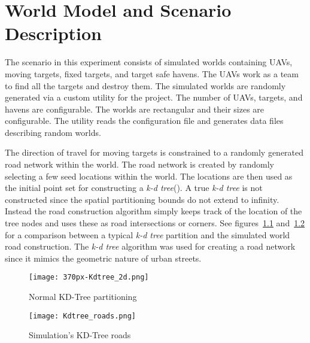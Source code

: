 \chapter{World Model and Scenario Description}

The scenario in this experiment consists of simulated worlds containing UAVs, moving targets, fixed targets, and target safe havens.  The UAVs work as a team to find all the targets and destroy them.  The simulated worlds are randomly generated via a custom utility for the project.  The number of UAVs, targets, and havens are configurable.  The worlds are rectangular and their sizes are configurable.  The utility reads the configuration file and generates data files describing random worlds.


The direction of travel for moving targets is constrained to a randomly generated road network within the world.  The road network is created by randomly selecting a few seed locations within the world.  The locations are then used as the initial point set for constructing a \textit{k-d tree}(\cite{wiki:kdtree}).  A true \textit{k-d tree} is not constructed since the spatial partitioning bounds do not extend to infinity.  Instead the road construction algorithm simply keeps track of the location of the tree nodes and uses these as road intersections or corners.  See figures~\ref{fig:kdtree} and~\ref{fig:kdtreeroads} for a comparison between a typical \textit{k-d tree} partition and the simulated world road construction.  The \textit{k-d tree} algorithm was used for creating a road network since it mimics the geometric nature of urban streets.

\begin{figure}[h]
	\centering
	\texttt{[image: 370px-Kdtree\_2d.png]}
	\caption{Normal KD-Tree partitioning\protect\footnotemark}
	\label{fig:kdtree}
\end{figure}

\begin{figure}[h]
	\centering
	\texttt{[image: Kdtree\_roads.png]}
	\caption{Simulation's KD-Tree roads}
	\label{fig:kdtreeroads}
\end{figure}


